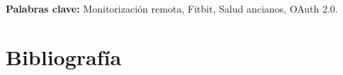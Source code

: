 \documentclass[12pt, a4paper, oneside]{book}
\begin{document}
\vspace{1cm} %
\textbf{Palabras clave:} Monitorización remota, Fitbit, Salud ancianos, OAuth 2.0. 

\tableofcontents










\cleardoublepage
{}
\chapter*{Bibliografía}
\cleardoublepage
\appendix %
\begin{appendices} %

 







\end{appendices}
\end{document}
